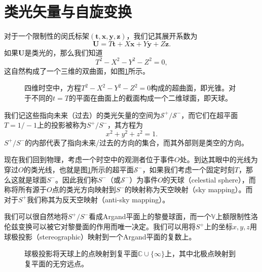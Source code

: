 \section{类光矢量与自旋变换}

对于一个限制性的闵氏标架$(\boldsymbol{t} ,\boldsymbol{x} ,\boldsymbol{y} ,\boldsymbol{z})$，我们记其展开系数为
\begin{equation*}
	\boldsymbol{U} =T\boldsymbol{t} +X\boldsymbol{x} +Y\boldsymbol{y} +Z\boldsymbol{z} .
\end{equation*}
如果$\boldsymbol{U}$是类光的，那么我们知道
\begin{equation}
	T^{2} -X^{2} -Y^{2} -Z^{2} =0,
	\label{eq:lightlike vector}
\end{equation}
这自然构成了一个三维的双曲面，如图\ref{fig:lightcone}所示。

\begin{figure}[h]
	\centering
	
	\caption{四维时空中，方程$T^{2} -X^{2} -Y^{2} -Z^{2} =0$构成的超曲面，即光锥。对于不同的$t=T$的平面在曲面上的截面构成一个二维球面，即天球。}
	\label{fig:lightcone}
\end{figure}

我们记这些指向未来（过去）的类光矢量的空间为$\mathcal{S}^{+} /\mathcal{S}^{-}$，而它们在超平面$T=1/-1$上的投影被称为$S^{+} /S^{-}$，其方程为
\begin{equation*}
	x^{2} +y^{2} +z^{2} =1.
\end{equation*}
$S^{+} /S^{-}$的内部代表了指向未来/过去的方向的集合，而其外部则是类空的方向。



现在我们回到物理，考虑一个时空中的观测者位于事件$O$处。到达其眼中的光线为穿过$O$的类光线，也就是图\ref{fig:lightcone}所示的超平面$\mathcal{S}^{-}$，如果我们考虑一个固定时刻$T$，那么这就是球面$S^{-}$。因此我们称$S^{-}$（或$\mathcal{S}^{-}$）为事件$O$的天球（celestial sphere），而称将所有源于$O$点的类光方向映射到$S^{-}$的映射称为天空映射（sky mapping）。而对于$S^{+}$我们称其为反天空映射（anti-sky mapping）。



我们可以很自然地将$S^{+} /S^{-}$看成Argand平面上的黎曼球面，而一个$\mathbb{V}$上额限制性洛伦兹变换可以被它对黎曼面的作用而唯一决定。我们可以用将$S^{+}$上的坐标$x,y,z$用球极投影（stereographic）映射到一个Argand平面的复数上。

\begin{figure}[h]
	\centering
	
	\caption{球极投影将天球上的点映射到复平面$\mathbb{C} \cup \{\infty \}$上，其中北极点映射到复平面的无穷远点。}
	\label{fig:argand-plane}
\end{figure}

